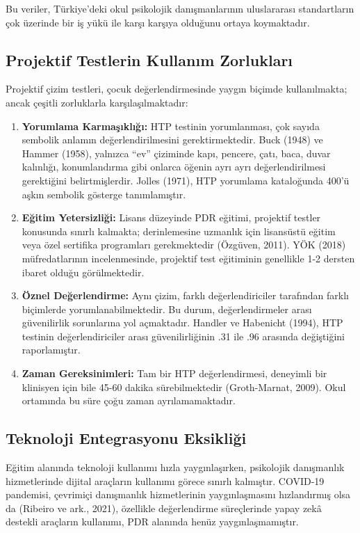 Bu veriler, Türkiye'deki okul psikolojik danışmanlarının uluslararası standartların çok üzerinde bir iş yükü ile karşı karşıya olduğunu ortaya koymaktadır.

\subsection{Projektif Testlerin Kullanım Zorlukları}

Projektif çizim testleri, çocuk değerlendirmesinde yaygın biçimde kullanılmakta; ancak çeşitli zorluklarla karşılaşılmaktadır:

\begin{enumerate}
  \item \textbf{Yorumlama Karmaşıklığı:} HTP testinin yorumlanması, çok sayıda sembolik anlamın değerlendirilmesini gerektirmektedir. Buck (1948) ve Hammer (1958), yalnızca ``ev'' çiziminde kapı, pencere, çatı, baca, duvar kalınlığı, konumlandırma gibi onlarca öğenin ayrı ayrı değerlendirilmesi gerektiğini belirtmişlerdir. Jolles (1971), HTP yorumlama kataloğunda 400'ü aşkın sembolik gösterge tanımlamıştır.

  \item \textbf{Eğitim Yetersizliği:} Lisans düzeyinde PDR eğitimi, projektif testler konusunda sınırlı kalmakta; derinlemesine uzmanlık için lisansüstü eğitim veya özel sertifika programları gerekmektedir (Özgüven, 2011). YÖK (2018) müfredatlarının incelenmesinde, projektif test eğitiminin genellikle 1-2 dersten ibaret olduğu görülmektedir.

  \item \textbf{Öznel Değerlendirme:} Aynı çizim, farklı değerlendiriciler tarafından farklı biçimlerde yorumlanabilmektedir. Bu durum, değerlendirmeler arası güvenilirlik sorunlarına yol açmaktadır. Handler ve Habenicht (1994), HTP testinin değerlendiriciler arası güvenilirliğinin .31 ile .96 arasında değiştiğini raporlamıştır.

  \item \textbf{Zaman Gereksinimleri:} Tam bir HTP değerlendirmesi, deneyimli bir klinisyen için bile 45-60 dakika sürebilmektedir (Groth-Marnat, 2009). Okul ortamında bu süre çoğu zaman ayrılamamaktadır.
\end{enumerate}

\subsection{Teknoloji Entegrasyonu Eksikliği}

Eğitim alanında teknoloji kullanımı hızla yaygınlaşırken, psikolojik danışmanlık hizmetlerinde dijital araçların kullanımı görece sınırlı kalmıştır. COVID-19 pandemisi, çevrimiçi danışmanlık hizmetlerinin yaygınlaşmasını hızlandırmış olsa da (Ribeiro ve ark., 2021), özellikle değerlendirme süreçlerinde yapay zekâ destekli araçların kullanımı, PDR alanında henüz yaygınlaşmamıştır.

